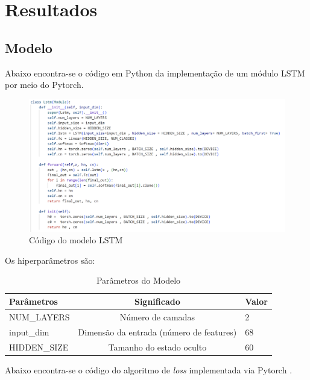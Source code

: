 \chapter{Resultados}
\label{resultados}

\section{Modelo}

Abaixo encontra-se o código em Python da implementação de um módulo LSTM por meio do Pytorch.

\begin{figure}[ht]
    \centering
    \includegraphics[scale=0.5]{tg1/figuras/codigo.png}
    \caption{Código do modelo LSTM}
    \label{fig:codigo_lstm}
\end{figure}

Os hiperparâmetros são:
\begin{table}[h]
    \centering
    \begin{tabular}{|l|c|l|}
        \hline
        \textbf{Parâmetros} & \textbf{Significado} & \textbf{Valor} \\
        \hline
        NUM\_LAYERS & Número de camadas & 2 \\
        input\_dim & Dimensão da entrada (número de features) &  68\\
        HIDDEN\_SIZE & Tamanho do estado oculto &  60\\
        \hline
    \end{tabular}
    \caption{Parâmetros do Modelo}
    \label{tab:hiperparametros}
\end{table}

Abaixo encontra-se o código do algoritmo de \textit{loss} implementada via Pytorch \cite{Lin_Goyal_Girshick_He_Dollar_2017}.

